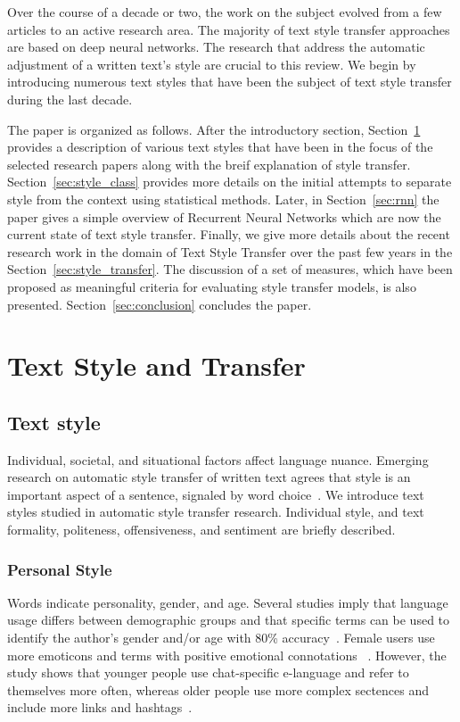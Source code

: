 \documentclass[akbc,twoside,11pt]{article}
\begin{document}
Over the course of a decade or two, the work on the subject evolved from a few articles to an active research area. The majority of text style transfer approaches are based on deep neural networks. The research that address the automatic adjustment of a written text's style are crucial to this review. We begin by introducing numerous text styles that have been the subject of text style transfer during the last decade.

The paper is organized as follows. After the introductory section, Section~\ref{sec:textual_style} provides a description of various text styles that have been in the focus of the selected research papers along with the breif explanation of style transfer. Section~\ref{sec:style_class} provides more details on the initial attempts to separate style from the context using statistical methods. Later, in Section~\ref{sec:rnn} the paper gives a simple overview of Recurrent Neural Networks which are now the current state of text style transfer. Finally, we give more details about the recent research work in the domain of Text Style Transfer over the past few years in the Section~\ref{sec:style_transfer}. The discussion of a set of measures, which have been proposed as meaningful criteria for evaluating style transfer models, is also presented. Section~\ref{sec:conclusion} concludes the paper.

\section{Text Style and Transfer}
\label{sec:textual_style}

\subsection{Text style}

Individual, societal, and situational factors affect language nuance. Emerging research on automatic style transfer of written text agrees that style is an important aspect of a sentence, signaled by word choice~\cite{argamon2010rest}. We introduce text styles studied in automatic style transfer research. Individual style, and text formality, politeness, offensiveness, and sentiment are briefly described. 

\subsubsection{Personal Style}

Words indicate personality, gender, and age. Several studies imply that language usage differs between demographic groups and that specific terms can be used to identify the author's gender and/or age with 80\% accuracy~\cite{koppel2001automatically}. Female users use more emoticons and terms with positive emotional connotations ~\cite{rao2010classifying}. However, the study shows that younger people use chat-specific e-language and refer to themselves more often, whereas older people use more complex sectences and include more links and hashtags~\cite{nguyen2013old}.
\end{document}
